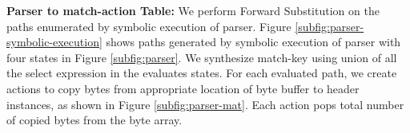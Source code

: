 \documentclass{hotnets19}
\begin{document}
\textbf{Parser to match-action Table:} 
We perform Forward Substitution \cite{Padua:1986:ACO:7902.7904} on the paths enumerated by symbolic execution of parser.
Figure \ref{subfig:parser-symbolic-execution} shows paths generated by symbolic execution of parser with four states in Figure \ref{subfig:parser}.
We synthesize match-key using union of all the select expression in the evaluates states.
For each evaluated path, we create actions to copy bytes from appropriate location of byte buffer to header instances, as shown in Figure \ref{subfig:parser-mat}.
Each action pops total number of copied bytes from the byte array.

\end{document}

